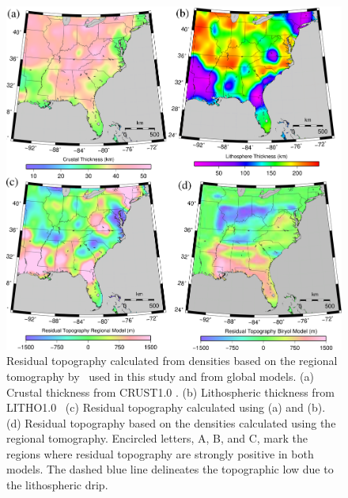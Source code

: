 \documentclass[draft,linenumbers]{agujournal2018}
\begin{document}
\begin{figure}[h!]
    \centering
    \includegraphics[width=\linewidth]{figures/topography.png}
    \caption{Residual topography calculated from densities based on the regional tomography by~\citet{Biryol_2016} used in this study and from global models. (a) Crustal thickness from CRUST1.0 \citep{laske2013update}. (b) Lithospheric thickness from LITHO1.0~\citep{pasyanos2014litho1} (c) Residual topography calculated using (a) and (b). (d) Residual topography based on the densities calculated using the regional tomography. Encircled letters, A, B, and C, mark the regions where residual topography are strongly positive in both models. The dashed blue line delineates the topographic low due to the lithospheric drip.}%
    \label{topo_res}
\end{figure}
\end{document}
